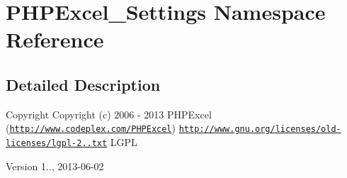 \hypertarget{namespacePHPExcel__Settings}{}\section{P\+H\+P\+Excel\+\_\+\+Settings Namespace Reference}
\label{namespacePHPExcel__Settings}


\subsection{Detailed Description}
\begin{DoxyCopyright}{Copyright}
Copyright (c) 2006 -\/ 2013 P\+H\+P\+Excel (\href{http://www.codeplex.com/PHPExcel}{\tt http\+://www.\+codeplex.\+com/\+P\+H\+P\+Excel})  \href{http://www.gnu.org/licenses/old-licenses/lgpl-2.1.txt}{\tt http\+://www.\+gnu.\+org/licenses/old-\/licenses/lgpl-\/2..\+txt} L\+G\+PL 
\end{DoxyCopyright}
\begin{DoxyVersion}{Version}
1.., 2013-\/06-\/02 
\end{DoxyVersion}

